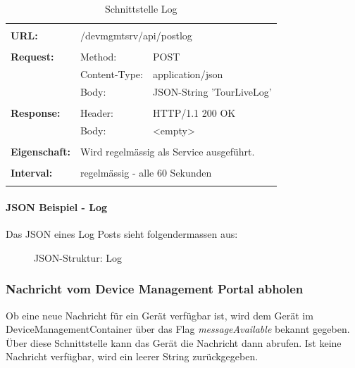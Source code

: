 {\renewcommand{\arraystretch}{1}
\begin{longtable}{ p{2.5cm} || p{3.5cm} p{5.5cm}}
&  \\ [-1.5ex]
	\textbf{URL:} & \multicolumn{2}{p{9cm}}{/devmgmtsrv/api/postlog}  \\ [1ex] \hline & &  \\ [-1.5ex]
	\textbf{Request:} & Method: & POST \\
		& Content-Type: & application/json \\
		& Body: & JSON-String 'TourLiveLog'  \\ [1ex] \hline & &  \\ [-1.5ex]
	\textbf{Response:} &  Header: & HTTP/1.1 200 OK \\
		& Body: & <empty>	 \\ [1ex] \hline & &  \\ [-1.5ex]
	\textbf{Eigenschaft:} &  \multicolumn{2}{p{9cm}}{Wird regelmässig als Service ausgeführt.} \\ [1ex] \hline & &  \\ [-1.5ex]
	\textbf{Interval:} &  \multicolumn{2}{p{9cm}}{regelmässig - alle 60 Sekunden} \\ [1ex] 
	
\caption{Schnittstelle Log}
\end{longtable}}

\paragraph{JSON Beispiel - Log}

Das JSON eines Log Posts sieht folgendermassen aus:

\begin{figure}[H]
	\centering
	
	\caption{JSON-Struktur: Log}
\end{figure}

\newpage
\subsubsection{Nachricht vom Device Management Portal abholen}

Ob eine neue Nachricht für ein Gerät verfügbar ist, wird dem Gerät im DeviceManagementContainer über das Flag \textit{messageAvailable} bekannt gegeben. Über diese Schnittstelle kann das Gerät die Nachricht dann abrufen. Ist keine Nachricht verfügbar, wird ein leerer String zurückgegeben.

